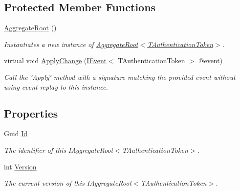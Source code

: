 \subsection*{Protected Member Functions}
\begin{DoxyCompactItemize}
\item 
\hyperlink{classCqrs_1_1Domain_1_1AggregateRoot_a1db2322dd7442e1e0c3c07332124eb2f_a1db2322dd7442e1e0c3c07332124eb2f}{Aggregate\+Root} ()
\begin{DoxyCompactList}\small\item\em Instantiates a new instance of \hyperlink{classCqrs_1_1Domain_1_1AggregateRoot_a1db2322dd7442e1e0c3c07332124eb2f_a1db2322dd7442e1e0c3c07332124eb2f}{Aggregate\+Root$<$\+T\+Authentication\+Token$>$}. \end{DoxyCompactList}\item 
virtual void \hyperlink{classCqrs_1_1Domain_1_1AggregateRoot_a7e299b13c7556731e52670aa6d782296_a7e299b13c7556731e52670aa6d782296}{Apply\+Change} (\hyperlink{interfaceCqrs_1_1Events_1_1IEvent}{I\+Event}$<$ T\+Authentication\+Token $>$ @event)
\begin{DoxyCompactList}\small\item\em Call the \char`\"{}\+Apply\char`\"{} method with a signature matching the provided {\itshape event}  without using event replay to this instance. \end{DoxyCompactList}\end{DoxyCompactItemize}
\subsection*{Properties}
\begin{DoxyCompactItemize}
\item 
Guid \hyperlink{classCqrs_1_1Domain_1_1AggregateRoot_ab84d521c8c3bffd3c2e58959984d1e88_ab84d521c8c3bffd3c2e58959984d1e88}{Id}
\begin{DoxyCompactList}\small\item\em The identifier of this I\+Aggregate\+Root$<$\+T\+Authentication\+Token$>$. \end{DoxyCompactList}\item 
int \hyperlink{classCqrs_1_1Domain_1_1AggregateRoot_a15f351663975c1d8e2cdc37b8c4d970f_a15f351663975c1d8e2cdc37b8c4d970f}{Version}
\begin{DoxyCompactList}\small\item\em The current version of this I\+Aggregate\+Root$<$\+T\+Authentication\+Token$>$. \end{DoxyCompactList}\end{DoxyCompactItemize}


